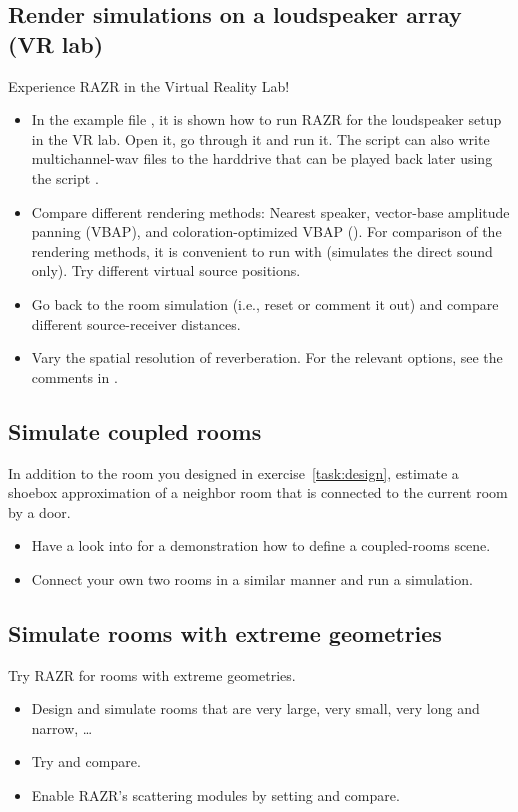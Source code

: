 \documentclass[a4paper, fleqn, 11pt]{article}
\begin{document}
\subsection{Render simulations on a loudspeaker array (VR lab)}
Experience RAZR in the Virtual Reality Lab!
\begin{itemize}
  \item In the example file , it is shown how to run RAZR for the loudspeaker setup in the VR lab. Open it, go through it and run it. The script can also write multichannel-wav files to the harddrive that can be played back later using the script .
  \item Compare different rendering methods: Nearest speaker, vector-base amplitude panning (VBAP), and coloration-optimized VBAP (). For comparison of the rendering methods, it is convenient to run  with  (simulates the direct sound only). Try different virtual source positions.
  \item Go back to the room simulation (i.e., reset  or comment it out) and compare different source-receiver distances.
  \item Vary the spatial resolution of reverberation. For the relevant options, see the comments in .
\end{itemize}

\subsection{Simulate coupled rooms}
In addition to the room you designed in exercise~\ref{task:design}, estimate a shoebox approximation of a neighbor room that is connected to the current room by a door.
\begin{itemize}
    \item Have a look into  for a demonstration how to define a coupled-rooms scene.
    \item Connect your own two rooms in a similar manner and run a simulation.
\end{itemize}

\subsection{Simulate rooms with extreme geometries}
Try RAZR for rooms with extreme geometries.
\begin{itemize}
    \item Design and simulate rooms that are very large, very small, very long and narrow, …
    \item Try  and compare.
    \item Enable RAZR’s scattering modules by setting  and compare.
\end{itemize}
\end{document}
